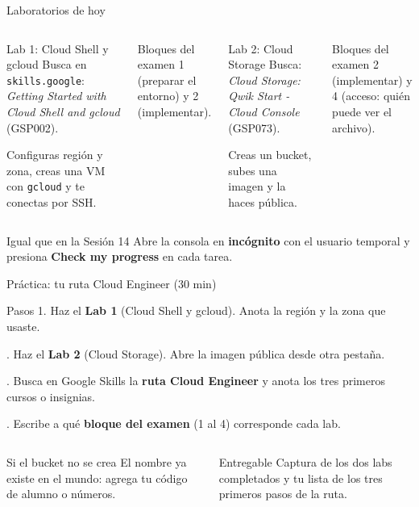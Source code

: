 \documentclass[aspectratio=169,10pt,c]{beamer}
\begin{document}
\begin{frame}[fragile]{Laboratorios de hoy}
\begin{columns}[T,onlytextwidth]
\begin{exampleblock}{Lab 1: Cloud Shell y gcloud}
\small Busca en \texttt{skills.google}: \emph{Getting Started with Cloud Shell and gcloud} (GSP002).\par\smallskip
Configuras región y zona, creas una VM con \texttt{gcloud} y te conectas por SSH.
\end{exampleblock}
\begin{block}{Bloques del examen}
\small 1 (preparar el entorno) y 2 (implementar).
\end{block}
\begin{exampleblock}{Lab 2: Cloud Storage}
\small Busca: \emph{Cloud Storage: Qwik Start - Cloud Console} (GSP073).\par\smallskip
Creas un bucket, subes una imagen y la haces pública.
\end{exampleblock}
\begin{block}{Bloques del examen}
\small 2 (implementar) y 4 (acceso: quién puede ver el archivo).
\end{block}
\end{columns}
\par\vspace{1mm}
\begin{alertblock}{Igual que en la Sesión 14}
\small Abre la consola en \textbf{incógnito} con el usuario temporal y presiona \textbf{Check my progress} en cada tarea.
\end{alertblock}
\end{frame}

\begin{frame}{Práctica: tu ruta Cloud Engineer \textnormal{\small(30 min)}}
\begin{block}{Pasos}
\small
1. Haz el \textbf{Lab 1} (Cloud Shell y gcloud). Anota la región y la zona que usaste.\par{}. Haz el \textbf{Lab 2} (Cloud Storage). Abre la imagen pública desde otra pestaña.\par{}. Busca en Google Skills la \textbf{ruta Cloud Engineer} y anota los tres primeros cursos o insignias.\par{}. Escribe a qué \textbf{bloque del examen} (1 al 4) corresponde cada lab.
\end{block}
\begin{columns}[T,onlytextwidth]
\begin{exampleblock}{Si el bucket no se crea}
\small El nombre ya existe en el mundo: agrega tu código de alumno o números.
\end{exampleblock}
\begin{alertblock}{Entregable}
\small Captura de los dos labs completados y tu lista de los tres primeros pasos de la ruta.
\end{alertblock}
\end{columns}
\end{frame}
\end{document}

